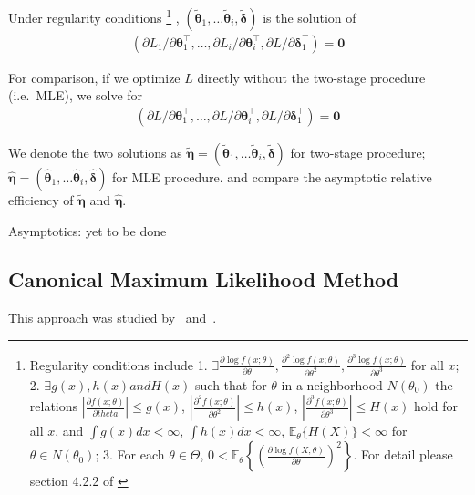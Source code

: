 Under regularity conditions
\footnote{Regularity conditions include
1. $\exists \frac{\partial \log f(x;\theta)}{\partial \theta}, \frac{\partial^2 \log f(x;\theta)}{\partial \theta^2}, \frac{\partial^3 \log f(x;\theta)}{\partial \theta^3}$ for all $x$;
2. $\exists g(x), h(x) and H(x)$ such that for $\theta$ in a neighborhood $N(\theta_0)$ the relations
$\left|\frac{\partial f(x;\theta)}{\partial theta}\right| \leq g(x)$,
$\left|\frac{\partial^2 f(x;\theta)}{\partial \theta^2}\right| \leq h(x)$,
$\left|\frac{\partial^3 f(x;\theta)}{\partial \theta^3}\right| \leq H(x)$ hold for all $x$, and
$\int g(x) dx < \infty$, $\int h(x) dx < \infty$, $\mathbb{E}_\theta \{H(X)\} < \infty$ for $\theta \in N(\theta_0)$;
3. For each $\theta \in \Theta$, $0< \mathbb{E}_\theta \left\{
\left(
\frac{\partial \log f(X;\theta)}{\partial \theta}
\right)^2
\right\}$. For detail please section 4.2.2 of \cite{serfling2009approximation}}
, $(\pmb{\tilde{\theta}}_1,\dots \pmb{\tilde{\theta}}_i, \pmb{\tilde{\delta}})$ is the solution of
\begin{align}
    (\partial L_1 / \partial \pmb{\theta}^\intercal_1,
    \dots, \partial L_i / \partial \pmb{\theta}^\intercal_i, \partial L / \partial \pmb{\pmb{\delta}}^\intercal_1) = \pmb{0}
    \end{align}

For comparison, if we optimize $L$ directly without the two-stage procedure (i.e.~MLE), we solve for
\begin{align}
    (\partial L / \partial \pmb{\theta}^\intercal_1,
    \dots, \partial L / \partial \pmb{\theta}^\intercal_i, \partial L / \partial \pmb{\pmb{\delta}}^\intercal_1) = \pmb{0}
    \end{align}

We denote the two solutions as
$\tilde{\pmb{\eta}} = (\pmb{\tilde{\theta}}_1,\dots \pmb{\tilde{\theta}}_i, \pmb{\tilde{\delta}})$ for two-stage procedure;
$\hat{\pmb{\eta}} =(\pmb{\hat{\theta}}_1,\dots \pmb{\hat{\theta}}_i, \pmb{\hat{\delta}})$ for MLE procedure.
and compare the asymptotic relative efficiency of $\tilde{\pmb{\eta}}$ and $\hat{\pmb{\eta}}$.

Asymptotics: yet to be done

\subsection{Canonical Maximum Likelihood Method}\label{subsec:canonical-maximum-likelihood-method}
This approach was studied by~\cite{genest1995semiparametric} and~\cite{shih1995inferences}.



